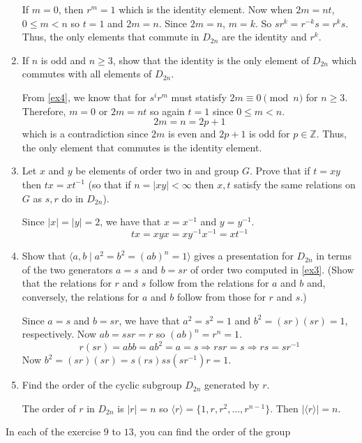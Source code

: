 \begin{enumerate}
  If \(m = 0\), then \(r^m = 1\) which is the identity element.
  Now when \(2m = nt\), \(0\leq m < n\) so \(t = 1\) and \(2m = n\).
  Since \(2m = n\), \(m = k\).
  So \(sr^k = r^{-k}s = r^ks\).
  Thus, the only elements that commute in \(D_{2n}\) are the identity and
  \(r^k\).
\item
  If \(n\) is odd and \(n\geq 3\), show that the identity is the only element
  of \(D_{2n}\) which commutes with all elements of \(D_{2n}\).
  \par\smallskip
  From \cref{ex4}, we know that for \(s^ir^m\) must statisfy
  \(2m\equiv 0\pmod{n}\) for \(n\geq 3\).
  Therefore, \(m = 0\) or \(2m = nt\) so again \(t = 1\) since \(0\leq m < n\).
  \[
  2m = n = 2p + 1
  \]
  which is a contradiction since \(2m\) is even and \(2p + 1\) is odd for
  \(p\in\mathbb{Z}\).
  Thus, the only element that commutes is the identity element.
\item
  Let \(x\) and \(y\) be elements of order two in and group \(G\).
  Prove that if \(t = xy\) then \(tx = xt^{-1}\) (so that if
  \(n = \lvert xy\rvert < \infty\) then \(x,t\) satisfy the same relations on
  \(G\) as \(s,r\) do in \(D_{2n}\)).
  \par\smallskip
  Since \(\lvert x\rvert = \lvert y\rvert = 2\), we have that \(x = x^{-1}\)
  and \(y = y^{-1}\).
  \[
  tx = xyx = xy^{-1}x^{-1} = xt^{-1}
  \]
\item
  Show that \(\langle a,b\mid a^2 = b^2 = (ab)^n = 1\rangle\) gives a
  presentation for \(D_{2n}\) in terms of the two generators \(a = s\) and
  \(b = sr\) of order two computed in \cref{ex3}.
  (Show that the relations for \(r\) and \(s\) follow from the relations for
  \(a\) and \(b\) and, conversely, the relations for \(a\) and \(b\) follow
  from those for \(r\) and \(s\).)
  \par\smallskip
  Since \(a = s\) and \(b = sr\), we have that \(a^2 = s^2 = 1\) and
  \(b^2 = (sr)(sr) = 1\), respectively.
  Now \(ab = ssr = r\) so \((ab)^n = r^n = 1\).
  \[
  r(sr) = abb = ab^2 = a = s\Rightarrow rsr = s\Rightarrow rs = sr^{-1}
  \]
  Now \(b^2 = (sr)(sr) = s(rs)s s(sr^{-1})r = 1\).
\item
  Find the order of the cyclic subgroup \(D_{2n}\) generated by \(r\).
  \par\smallskip
  The order of \(r\) in \(D_{2n}\) is \(\lvert r\rvert = n\) so
  \(\langle r\rangle = \{1,r,r^2,\ldots,r^{n - 1}\}\).
  Then \(\lvert\langle r\rangle\rvert = n\).
\end{enumerate}
In each of the exercise \(9\) to \(13\), you can find the order of the group
